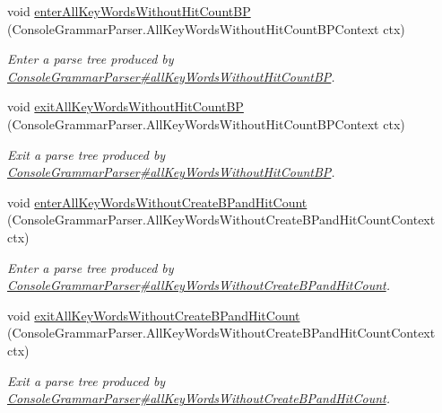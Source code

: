 \begin{DoxyCompactItemize}
void \hyperlink{interfacegov_1_1nasa_1_1jpf_1_1inspector_1_1client_1_1parser_1_1_console_grammar_listener_a7c1768947193dff8bc1e388b5438938b}{enter\+All\+Key\+Words\+Without\+Hit\+Count\+BP} (Console\+Grammar\+Parser.\+All\+Key\+Words\+Without\+Hit\+Count\+B\+P\+Context ctx)
\begin{DoxyCompactList}\small\item\em Enter a parse tree produced by \hyperlink{classgov_1_1nasa_1_1jpf_1_1inspector_1_1client_1_1parser_1_1_console_grammar_parser_a800f8f87a8c2b4569bab4a7074239325}{Console\+Grammar\+Parser\#all\+Key\+Words\+Without\+Hit\+Count\+BP}. \end{DoxyCompactList}\item 
void \hyperlink{interfacegov_1_1nasa_1_1jpf_1_1inspector_1_1client_1_1parser_1_1_console_grammar_listener_a233e2bb8111007a97c7a8e5c4a02717d}{exit\+All\+Key\+Words\+Without\+Hit\+Count\+BP} (Console\+Grammar\+Parser.\+All\+Key\+Words\+Without\+Hit\+Count\+B\+P\+Context ctx)
\begin{DoxyCompactList}\small\item\em Exit a parse tree produced by \hyperlink{classgov_1_1nasa_1_1jpf_1_1inspector_1_1client_1_1parser_1_1_console_grammar_parser_a800f8f87a8c2b4569bab4a7074239325}{Console\+Grammar\+Parser\#all\+Key\+Words\+Without\+Hit\+Count\+BP}. \end{DoxyCompactList}\item 
void \hyperlink{interfacegov_1_1nasa_1_1jpf_1_1inspector_1_1client_1_1parser_1_1_console_grammar_listener_a8f1fdd820855679876a0aca25730f2d9}{enter\+All\+Key\+Words\+Without\+Create\+B\+Pand\+Hit\+Count} (Console\+Grammar\+Parser.\+All\+Key\+Words\+Without\+Create\+B\+Pand\+Hit\+Count\+Context ctx)
\begin{DoxyCompactList}\small\item\em Enter a parse tree produced by \hyperlink{classgov_1_1nasa_1_1jpf_1_1inspector_1_1client_1_1parser_1_1_console_grammar_parser_aff31036dcee67dbba83def31e4761e4e}{Console\+Grammar\+Parser\#all\+Key\+Words\+Without\+Create\+B\+Pand\+Hit\+Count}. \end{DoxyCompactList}\item 
void \hyperlink{interfacegov_1_1nasa_1_1jpf_1_1inspector_1_1client_1_1parser_1_1_console_grammar_listener_a2d3cbd2f27b49bd39b7fb50384840425}{exit\+All\+Key\+Words\+Without\+Create\+B\+Pand\+Hit\+Count} (Console\+Grammar\+Parser.\+All\+Key\+Words\+Without\+Create\+B\+Pand\+Hit\+Count\+Context ctx)
\begin{DoxyCompactList}\small\item\em Exit a parse tree produced by \hyperlink{classgov_1_1nasa_1_1jpf_1_1inspector_1_1client_1_1parser_1_1_console_grammar_parser_aff31036dcee67dbba83def31e4761e4e}{Console\+Grammar\+Parser\#all\+Key\+Words\+Without\+Create\+B\+Pand\+Hit\+Count}. \end{DoxyCompactList}\item 

\end{DoxyCompactItemize}
